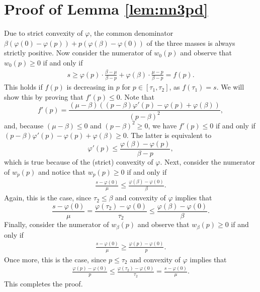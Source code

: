\documentclass[11pt]{article}
\newcommand{\1}{\mathds{1}}
\begin{document}
\section{Proof of Lemma \ref{lem:nn3pd}}\label{ap:proof_nn3pd}
Due to strict convexity of $\varphi$, the common denominator $\beta(\varphi(0) - \varphi(p)) + p(\varphi(\beta) - \varphi(0))$ of the three masses is always strictly positive. Now consider the numerator of $w_0(p)$ and observe that $w_0(p) \geq 0$ if and only if
\begin{align*}
    s\geq \varphi(p)\cdot\frac{\beta-\mu}{\beta-p} + \varphi(\beta)\cdot \frac{\mu-p}{\beta-p} = f(p).
\end{align*}
This holds if $f(p)$ is decreasing in $p$ for $p \in [\tau_1,\tau_2]$, as $f(\tau_1) = s$. We will show this by proving that $f'(p) \leq 0$. Note that
$$f'(p) = \dfrac{\left({\mu}-{\beta}\right)\left(\left(p-{\beta}\right)\varphi'\left(p\right)-\varphi\left(p\right)+\varphi(\beta)\right)}{\left(p-{\beta}\right)^2},$$
and, because $(\mu - \beta) \leq 0$ and $(p-\beta)^2 \geq 0$, we have $f'(p) \leq 0$ if and only if $\left(p-{\beta}\right)\varphi'\left(p\right)-\varphi\left(p\right)+\varphi(\beta) \geq 0$. The latter is equivalent to
$$
\varphi'(p) \leq \frac{\varphi(\beta)-\varphi(p)}{\beta-p},
$$
which is true because of the (strict) convexity of $\varphi$. Next, consider the numerator of $w_p(p)$ and notice that $w_p(p)\geq 0$ if and only if
\begin{align*}
    \frac{s-\varphi(0)}{\mu} \leq \frac{\varphi(\beta)-\varphi(0)}{\beta}.
\end{align*} Again, this is the case, since $\tau_2 \leq \beta$ and convexity of $\varphi$ implies that $$\frac{s-\varphi(0)}{\mu} = \frac{\varphi(\tau_2)-\varphi(0)}{\tau_2} \leq \frac{\varphi(\beta)-\varphi(0)}{\beta}.$$ Finally, consider the numerator of $w_{\beta}(p)$ and observe that $w_{\beta}(p)\geq 0$ if and only if
\begin{align*}
    \frac{s-\varphi(0)}{\mu} \geq \frac{\varphi(p)-\varphi(0)}{p}.
\end{align*} 
Once more, this is the case, since $p \leq \tau_2$ and convexity of $\varphi$ implies that 
\begin{align*}
    \frac{\varphi(p)-\varphi(0)}{p} \leq \frac{\varphi(\tau_2)-\varphi(0)}{\tau_2} = \frac{s-\varphi(0)}{\mu}.
\end{align*}
This completes the proof.
\end{document}
